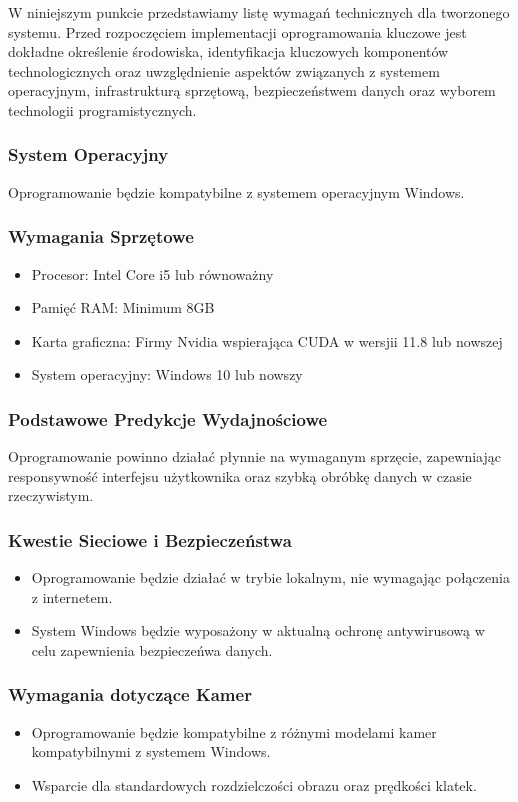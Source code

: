 W niniejszym punkcie przedstawiamy listę wymagań technicznych dla tworzonego systemu. 
Przed rozpoczęciem implementacji oprogramowania kluczowe jest dokładne określenie środowiska, 
identyfikacja kluczowych komponentów technologicznych oraz uwzględnienie aspektów związanych 
z systemem operacyjnym, infrastrukturą sprzętową, bezpieczeństwem danych oraz wyborem 
technologii programistycznych.

\subsubsection*{System Operacyjny}
Oprogramowanie będzie kompatybilne z systemem operacyjnym Windows.

\subsubsection*{Wymagania Sprzętowe} %
\begin{itemize}
    \item Procesor: Intel Core i5 lub równoważny
    \item Pamięć RAM: Minimum 8GB
    \item Karta graficzna: Firmy Nvidia wspierająca CUDA w wersjii 11.8 lub nowszej
    \item System operacyjny: Windows 10 lub nowszy
\end{itemize}

\subsubsection*{Podstawowe Predykcje Wydajnościowe}
Oprogramowanie powinno działać płynnie na wymaganym sprzęcie, zapewniając responsywność 
interfejsu użytkownika oraz szybką obróbkę danych w czasie rzeczywistym.

\subsubsection*{Kwestie Sieciowe i Bezpieczeństwa}
\begin{itemize}
    \item Oprogramowanie będzie działać w trybie lokalnym, nie wymagając połączenia z internetem.
    \item System Windows będzie wyposażony w aktualną ochronę antywirusową w celu zapewnienia bezpieczeńwa danych.
\end{itemize}

\subsubsection*{Wymagania dotyczące Kamer}
\begin{itemize}
    \item Oprogramowanie będzie kompatybilne z różnymi modelami kamer kompatybilnymi z systemem Windows.
    \item Wsparcie dla standardowych rozdzielczości obrazu oraz prędkości klatek.
\end{itemize}


